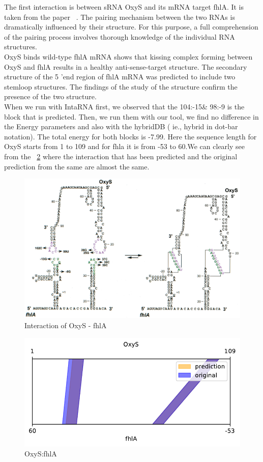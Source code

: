 \documentclass[twoside,a4paper]{report}
\begin{document}
	The first interaction is between sRNA OxyS and its mRNA target fhlA. It is taken from the paper ~\citep{argaman2000fhla}. The pairing mechanism between the two RNAs is dramatically influenced by their structure. For this purpose, a full comprehension of the pairing process involves thorough knowledge of the individual RNA structures. \\
	
	OxyS binds wild-type fhlA mRNA shows that kissing complex forming between OxyS and fhlA results in a healthy anti-sense-target structure. The secondary structure of the 5 'end region of fhlA mRNA was predicted to include two stemloop structures. The findings of the study of the structure confirm the presence of the two structure. \\
	
	When we run with IntaRNA first, we observed that the 104:-15\& 98:-9 is the block that is predicted. Then, we run them with our tool, we find no difference in the Energy parameters and also with the hybridDB ( ie., hybrid in dot-bar notation). The total energy for both blocks is -7.99. Here the sequence length for OxyS starts from 1 to 109 and for fhla it is from -53 to 60.We can clearly see from the ~\ref{fig:rricomparison1} where the interaction that has been predicted and the original prediction from the same are almost the same. \\
	


	\begin{figure}[h!tb]
	\includegraphics[width=1.0\linewidth]{oxys}
	\centering
	\caption{ Interaction of OxyS - fhlA } 
	\label{fig:oxys}
	\end{figure}

\begin{figure}[h!tb]
	\centering
	\includegraphics[width=.4\linewidth]{rricomparison1.pdf}
	\caption{OxyS:fhlA}
	\label{fig:rricomparison1}
\end{figure}
\end{document}
